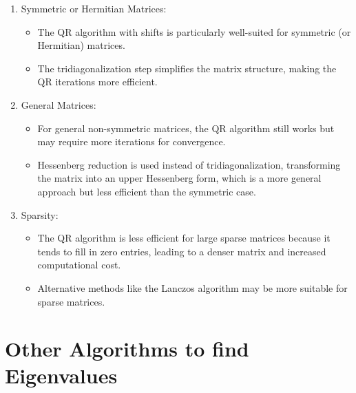\documentclass{article}
\theoremstyle{remark}
\begin{document}
\begin{enumerate}
    \item Symmetric or Hermitian Matrices:
    \begin{itemize}
        \item The QR algorithm with shifts is particularly well-suited for symmetric (or Hermitian) matrices.

        \item The tridiagonalization step simplifies the matrix structure, making the QR iterations more efficient.
    \end{itemize}

    \item General Matrices:
    \begin{itemize}
        \item For general non-symmetric matrices, the QR algorithm still works but may require more iterations for convergence.

        \item Hessenberg reduction is used instead of tridiagonalization, transforming the matrix into an upper Hessenberg form, which is a more general approach but less efficient than the symmetric case.
    \end{itemize}

    \item Sparsity: 
    \begin{itemize}
        \item The QR algorithm is less efficient for large sparse matrices because it tends to fill in zero entries, leading to a denser matrix and increased computational cost.

        \item Alternative methods like the Lanczos algorithm may be more suitable for sparse matrices.
    \end{itemize}
    
\end{enumerate}

\section{Other Algorithms to find Eigenvalues}
\end{document}
